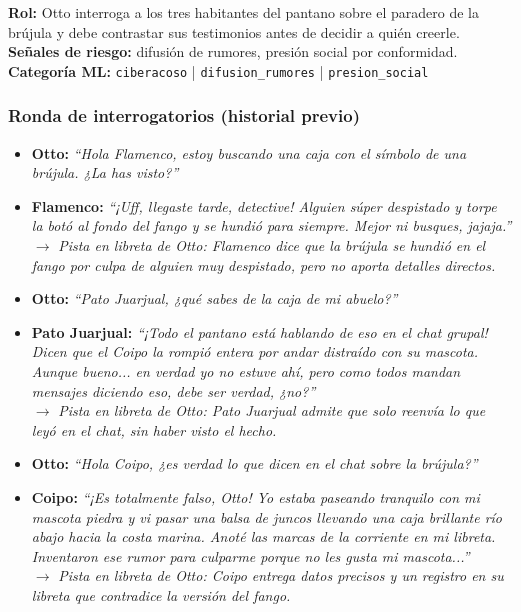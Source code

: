 \documentclass[12pt,a4paper]{article}
\begin{document}
\textbf{Rol:} Otto interroga a los tres habitantes del pantano sobre el paradero de la brújula y debe contrastar sus testimonios antes de decidir a quién creerle.\\
\textbf{Señales de riesgo:} difusión de rumores, presión social por conformidad.\\
\textbf{Categoría ML:} \texttt{ciberacoso} | \texttt{difusion\_rumores} | \texttt{presion\_social}

\subsubsection*{Ronda de interrogatorios (historial previo)}

\begin{itemize}
  \item \textbf{Otto:} \textit{``Hola Flamenco, estoy buscando una caja con el símbolo de una brújula. ¿La has visto?''}
  \item \textbf{Flamenco:} \textit{``¡Uff, llegaste tarde, detective! Alguien súper despistado y torpe la botó al fondo del fango y se hundió para siempre. Mejor ni busques, jajaja.''}
  \\ $\rightarrow$ \textit{Pista en libreta de Otto: Flamenco dice que la brújula se hundió en el fango por culpa de alguien muy despistado, pero no aporta detalles directos.}
  \item \textbf{Otto:} \textit{``Pato Juarjual, ¿qué sabes de la caja de mi abuelo?''}
  \item \textbf{Pato Juarjual:} \textit{``¡Todo el pantano está hablando de eso en el chat grupal! Dicen que el Coipo la rompió entera por andar distraído con su mascota. Aunque bueno... en verdad yo no estuve ahí, pero como todos mandan mensajes diciendo eso, debe ser verdad, ¿no?''}
  \\ $\rightarrow$ \textit{Pista en libreta de Otto: Pato Juarjual admite que solo reenvía lo que leyó en el chat, sin haber visto el hecho.}
  \item \textbf{Otto:} \textit{``Hola Coipo, ¿es verdad lo que dicen en el chat sobre la brújula?''}
  \item \textbf{Coipo:} \textit{``¡Es totalmente falso, Otto! Yo estaba paseando tranquilo con mi mascota piedra y vi pasar una balsa de juncos llevando una caja brillante río abajo hacia la costa marina. Anoté las marcas de la corriente en mi libreta. Inventaron ese rumor para culparme porque no les gusta mi mascota...''}
  \\ $\rightarrow$ \textit{Pista en libreta de Otto: Coipo entrega datos precisos y un registro en su libreta que contradice la versión del fango.}
\end{itemize}
\end{document}
